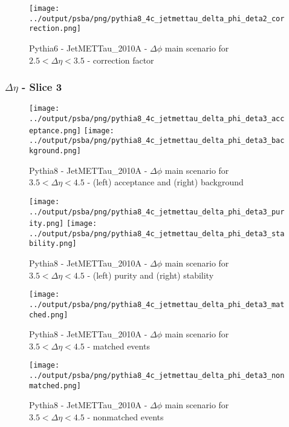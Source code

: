 \documentclass[11pt]{book}
\begin{document}
\begin{figure}[ht]
\centering
\texttt{[image: ../output/psba/png/pythia8\_4c\_jetmettau\_delta\_phi\_deta2\_correction.png]}
\caption{Pythia6 - JetMETTau\_2010A - $\Delta\phi$ main scenario for $2.5 < \Delta\eta < 3.5$ - correction factor}
\label{fig:p6_jetmettau_delta_phi_deta2_correction}
\end{figure}

\clearpage
\subsubsection{$\Delta\eta$ - Slice 3}

\begin{figure}[ht]
\centering
\texttt{[image: ../output/psba/png/pythia8\_4c\_jetmettau\_delta\_phi\_deta3\_acceptance.png]}
\texttt{[image: ../output/psba/png/pythia8\_4c\_jetmettau\_delta\_phi\_deta3\_background.png]}
\caption{Pythia8 - JetMETTau\_2010A - $\Delta\phi$ main scenario for $3.5 < \Delta\eta < 4.5$ - (left) acceptance and (right) background}
\label{fig:p8_jetmettau_delta_phi_deta3_ab}
\end{figure}

\begin{figure}[ht]
\centering
\texttt{[image: ../output/psba/png/pythia8\_4c\_jetmettau\_delta\_phi\_deta3\_purity.png]}
\texttt{[image: ../output/psba/png/pythia8\_4c\_jetmettau\_delta\_phi\_deta3\_stability.png]}
\caption{Pythia8 - JetMETTau\_2010A - $\Delta\phi$ main scenario for $3.5 < \Delta\eta < 4.5$ - (left) purity and (right) stability}
\label{fig:p8_jetmettau_delta_phi_deta3_ps}
\end{figure}

\begin{figure}[ht]
\centering
\texttt{[image: ../output/psba/png/pythia8\_4c\_jetmettau\_delta\_phi\_deta3\_matched.png]}
\caption{Pythia8 - JetMETTau\_2010A - $\Delta\phi$ main scenario for $3.5 < \Delta\eta < 4.5$ - matched events}
\label{fig:p8_jetmettau_delta_phi_deta3_matched}
\end{figure}

\begin{figure}[ht]
\centering
\texttt{[image: ../output/psba/png/pythia8\_4c\_jetmettau\_delta\_phi\_deta3\_nonmatched.png]}
\caption{Pythia8 - JetMETTau\_2010A - $\Delta\phi$ main scenario for $3.5 < \Delta\eta < 4.5$ - nonmatched events}
\label{fig:p8_jetmettau_delta_phi_deta3_nonmatched}
\end{figure}
\end{document}
